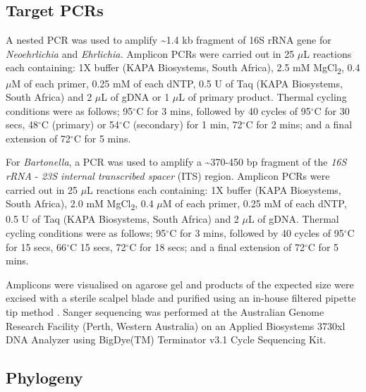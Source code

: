 \documentclass[a4paper, nobind]{templates/ociamthesis}
\begin{document}
\hypertarget{target-pcrs}{%
\subsection{Target PCRs}\label{target-pcrs}}

A nested PCR was used to amplify \textasciitilde1.4 kb fragment of 16S rRNA gene for \emph{Neoehrlichia} and \emph{Ehrlichia.}
Amplicon PCRs were carried out in 25 \(\mu\)L reactions each containing: 1X buffer (KAPA Biosystems, South Africa), 2.5 mM MgCl\textsubscript{2}, 0.4 \(\mu\)M of each primer, 0.25 mM of each dNTP, 0.5 U of Taq (KAPA Biosystems, South Africa) and 2 \(\mu\)L of gDNA or 1 \(\mu\)L of primary product.
Thermal cycling conditions were as follows; 95\(^\circ\)C for 3 mins, followed by 40 cycles of 95\(^\circ\)C for 30 secs, 48\(^\circ\)C (primary) or 54\(^\circ\)C (secondary) for 1 min, 72\(^\circ\)C for 2 mins; and a final extension of 72\(^\circ\)C for 5 mins.

For \emph{Bartonella}, a PCR was used to amplify a \textasciitilde370-450 bp fragment of the \emph{16S rRNA} - \emph{23S internal transcribed spacer} (ITS) region.
Amplicon PCRs were carried out in 25 \(\mu\)L reactions each containing: 1X buffer (KAPA Biosystems, South Africa), 2.0 mM MgCl\textsubscript{2}, 0.4 \(\mu\)M of each primer, 0.25 mM of each dNTP, 0.5 U of Taq (KAPA Biosystems, South Africa) and 2 \(\mu\)L of gDNA.
Thermal cycling conditions were as follows; 95\(^\circ\)C for 3 mins, followed by 40 cycles of 95\(^\circ\)C for 15 secs, 66\(^\circ\)C 15 secs, 72\(^\circ\)C for 18 secs; and a final extension of 72\(^\circ\)C for 5 mins.

Amplicons were visualised on agarose gel and products of the expected size were excised with a sterile scalpel blade and purified using an in-house filtered pipette tip method \autocite{yangSpecificQuantitativeDetection2013}.
Sanger sequencing was performed at the Australian Genome Research Facility (Perth, Western Australia) on an Applied Biosystems 3730xl DNA Analyzer using BigDye(TM) Terminator v3.1 Cycle Sequencing Kit.

\hypertarget{phylogeny}{%
\subsection{Phylogeny}\label{phylogeny}}
\end{document}

